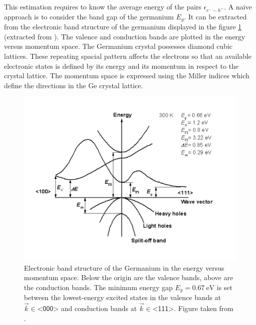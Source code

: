 This estimation requires to know the average energy of the pairs $\epsilon_{e^--h^+}$. A naive approach is to consider the band gap of the germanium $E_g$. It can be extracted from the electronic band structure of the germanium displayed in the figure \ref{fig:ge-band-structure} (extracted from \cite{ioffe:2020}). The valence and conduction bands are plotted in the energy versus momentum space. The Germanium crystal possesses diamond cubic lattices. These repeating spacial pattern affects the electrons so that an available electronic states is defined by its energy and its momentum in respect to the crystal lattice. The momentum space is expressed using the Miller indices which define the directions in the Ge crystal lattice.

\begin{figure}
\centering
\includegraphics[scale=0.66]{Figures/Electrodes/germanium_conduction_bands.pdf}
\caption{Electronic band structure of the Germanium in the energy versus momentum space. Below the origin are the valence bands, above are the conduction bands. The minimum energy gap $E_g = \SI{0.67}{\eV}$ is set between the lowest-energy excited states in the valence bands at $\vec{k} \in \textsf{<000>}$ and conduction bands at $\vec{k} \in \textsf{<111>}$. Figure taken from \cite{ioffe:2020}.}
\label{fig:ge-band-structure}
\end{figure}

